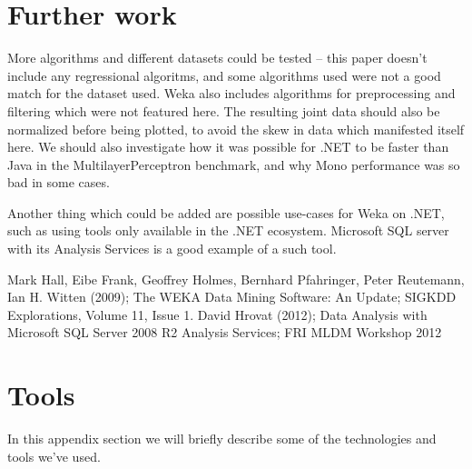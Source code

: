\documentclass[journal]{IEEEtran/IEEEtran}
\begin{document}
\section{Further work}
More algorithms and different datasets could be tested -- this paper doesn't include any regressional algoritms, and some algorithms used were not a good match for the dataset used. Weka also includes algorithms for preprocessing and filtering which were not featured here. The resulting joint data should also be normalized before being plotted, to avoid the skew in data which manifested itself here. We should also investigate how it was possible for .NET to be faster than Java in the MultilayerPerceptron benchmark, and why Mono performance was so bad in some cases.

Another thing which could be added are possible use-cases for Weka on .NET, such as using tools only available in the .NET ecosystem. Microsoft SQL server with its Analysis Services is a good example of a such tool\cite{sqlas:2012}.
\begin{thebibliography}{1}

Mark Hall, Eibe Frank, Geoffrey Holmes, Bernhard Pfahringer, Peter Reutemann, Ian H. Witten (2009); The WEKA Data Mining Software: An Update; SIGKDD Explorations, Volume 11, Issue 1.
David Hrovat (2012); Data Analysis with Microsoft SQL Server 2008 R2 Analysis Services; FRI MLDM Workshop 2012

\end{thebibliography}

\newpage

\appendices
\section{Tools}\label{Tools}
In this appendix section we will briefly describe some of the technologies and tools we've used.
\end{document}
